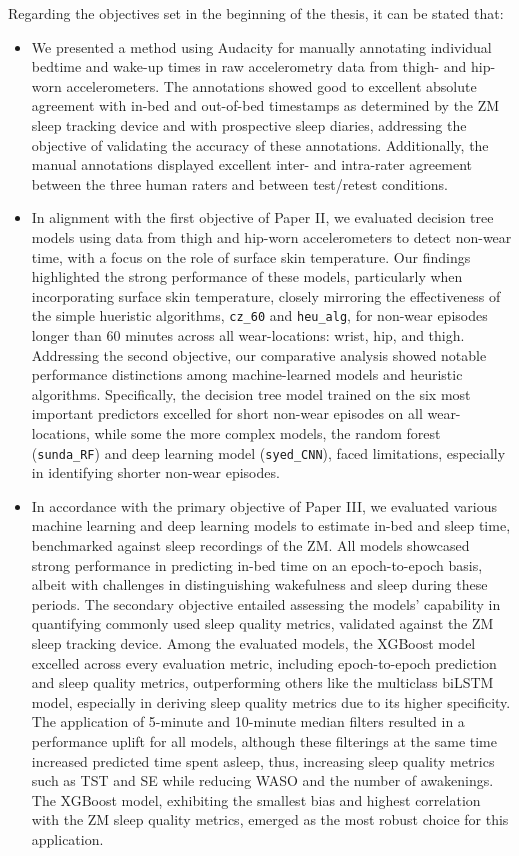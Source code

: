 \documentclass[
  10pt,
]{scrbook}
\begin{document}
Regarding the objectives set in the beginning of the thesis, it can be
stated that:

\begin{itemize}
\item
  We presented a method using Audacity for manually annotating
  individual bedtime and wake-up times in raw accelerometry data from
  thigh- and hip-worn accelerometers. The annotations showed good to
  excellent absolute agreement with in-bed and out-of-bed timestamps as
  determined by the ZM sleep tracking device and with prospective sleep
  diaries, addressing the objective of validating the accuracy of these
  annotations. Additionally, the manual annotations displayed excellent
  inter- and intra-rater agreement between the three human raters and
  between test/retest conditions.
\item
  In alignment with the first objective of Paper II, we evaluated
  decision tree models using data from thigh and hip-worn accelerometers
  to detect non-wear time, with a focus on the role of surface skin
  temperature. Our findings highlighted the strong performance of these
  models, particularly when incorporating surface skin temperature,
  closely mirroring the effectiveness of the simple hueristic
  algorithms, \texttt{cz\_60} and \texttt{heu\_alg}, for non-wear
  episodes longer than 60 minutes across all wear-locations: wrist, hip,
  and thigh. Addressing the second objective, our comparative analysis
  showed notable performance distinctions among machine-learned models
  and heuristic algorithms. Specifically, the decision tree model
  trained on the six most important predictors excelled for short
  non-wear episodes on all wear-locations, while some the more complex
  models, the random forest (\texttt{sunda\_RF}) and deep learning model
  (\texttt{syed\_CNN}), faced limitations, especially in identifying
  shorter non-wear episodes.
\item
  In accordance with the primary objective of Paper III, we evaluated
  various machine learning and deep learning models to estimate in-bed
  and sleep time, benchmarked against sleep recordings of the ZM. All
  models showcased strong performance in predicting in-bed time on an
  epoch-to-epoch basis, albeit with challenges in distinguishing
  wakefulness and sleep during these periods. The secondary objective
  entailed assessing the models' capability in quantifying commonly used
  sleep quality metrics, validated against the ZM sleep tracking device.
  Among the evaluated models, the XGBoost model excelled across every
  evaluation metric, including epoch-to-epoch prediction and sleep
  quality metrics, outperforming others like the multiclass biLSTM
  model, especially in deriving sleep quality metrics due to its higher
  specificity. The application of 5-minute and 10-minute median filters
  resulted in a performance uplift for all models, although these
  filterings at the same time increased predicted time spent asleep,
  thus, increasing sleep quality metrics such as TST and SE while
  reducing WASO and the number of awakenings. The XGBoost model,
  exhibiting the smallest bias and highest correlation with the ZM sleep
  quality metrics, emerged as the most robust choice for this
  application.
\end{itemize}
\end{document}
